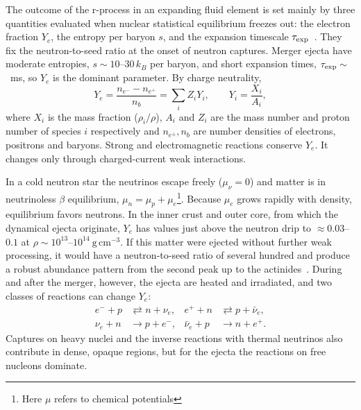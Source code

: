 The outcome of the r-process in an expanding fluid element is set mainly by three quantities evaluated when nuclear statistical equilibrium freezes out: the electron fraction $Y_e$, the entropy per baryon $s$, and the expansion timescale $\tau_{\rm exp}$~\cite{lippuner_r-process_2015}.
They fix the neutron-to-seed ratio at the onset of neutron captures.
Merger ejecta have moderate entropies, $s\sim10$--$30\,k_B$ per baryon, and short expansion times, $\tau_{\rm exp}\sim$~ms, so $Y_e$ is the dominant parameter.
By charge neutrality,
\begin{equation}
  Y_e = \frac{n_{e^-}-n_{e^+}}{n_b} = \sum_i Z_iY_i,\qquad Y_i=\frac{X_i}{A_i},
\end{equation}
where $X_i$ is the mass fraction ($\rho_i/\rho$), $A_i$ and $Z_i$ are the mass number and proton number of species $i$ respectively and $n_{e^\pm},n_b$ are number densities of electrons, positrons and baryons.
Strong and electromagnetic reactions conserve $Y_e$.
It changes only through charged-current weak interactions.

In a cold neutron star the neutrinos escape freely ($\mu_\nu=0$) and matter is in neutrinoless $\beta$ equilibrium, $\mu_n=\mu_p+\mu_e$\footnote{Here $\mu$ refers to chemical potentials}. 
Because $\mu_e$ grows rapidly with density, equilibrium favors neutrons.
In the inner crust and outer core, from which the dynamical ejecta originate, $Y_e$ has values just above the neutron drip to $\approx0.03$--$0.1$ at $\rho\sim10^{13}$--$10^{14}~\mathrm{g\,cm^{-3}}$.
If this matter were ejected without further weak processing, it would have a neutron-to-seed ratio of several hundred and produce a robust abundance pattern from the second peak up to the actinides~\cite{korobkin_astrophysical_2012}.
During and after the merger, however, the ejecta are heated and irradiated, and two classes of reactions can change $Y_e$:
\begin{align}
  e^-+p &\rightleftarrows n+\nu_e, & e^++n &\rightleftarrows p+\bar\nu_e,\label{eq:capt}\\
  \nu_e+n &\rightarrow p+e^-, & \bar\nu_e+p &\rightarrow n+e^+.\label{eq:abs}
\end{align}
Captures on heavy nuclei and the inverse reactions with thermal neutrinos also contribute in dense, opaque regions, but for the ejecta the reactions on free nucleons dominate.

